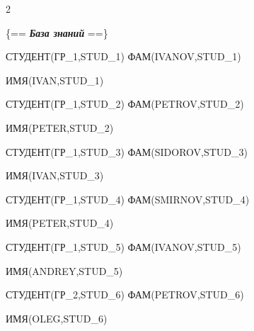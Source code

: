\begin{multicols}{2}
\columnbreak





{\small


\noindent


 \{== {\bfseries\textit{База знаний}} ==\}





\noindent


 СТУДЕНТ(ГР\_1,STUD\_1) ФАМ(IVANOV,STUD\_1)





 ИМЯ(IVAN,STUD\_1)





\noindent


 СТУДЕНТ(ГР\_1,STUD\_2) ФАМ(PETROV,STUD\_2)





 ИМЯ(PETER,STUD\_2)





\noindent


 СТУДЕНТ(ГР\_1,STUD\_3) ФАМ(SIDOROV,STUD\_3)





 ИМЯ(IVAN,STUD\_3)





\noindent


 СТУДЕНТ(ГР\_1,STUD\_4) ФАМ(SMIRNOV,STUD\_4)





 ИМЯ(PETER,STUD\_4)





\noindent


 СТУДЕНТ(ГР\_1,STUD\_5) ФАМ(IVANOV,STUD\_5)





 ИМЯ(ANDREY,STUD\_5)





\noindent


 СТУДЕНТ(ГР\_2,STUD\_6) ФАМ(PETROV,STUD\_6)





 ИМЯ(OLEG,STUD\_6)





}
\end{multicols}

